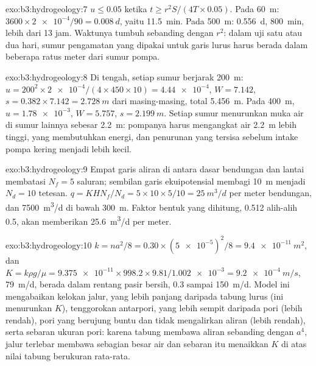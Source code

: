 \begin{solution}{exo:b3:hydrogeology:7}
$u \le 0.05$ ketika $t \ge r^2S/(4T\times0.05)$. Pada \qty{60}{m}: $3600\times
\num{2e-4}/90 = \qty{0.008}{d}$, yaitu \qty{11.5}{min}. Pada \qty{500}{m}:
\qty{0.556}{d}, \qty{800}{min}, lebih dari 13 jam. Waktunya tumbuh sebanding dengan $r^2$:
dalam uji satu atau dua hari, sumur pengamatan yang dipakai untuk garis lurus
harus berada dalam beberapa ratus meter dari sumur pompa.
\end{solution}

\begin{solution}{exo:b3:hydrogeology:8}
Di tengah, setiap sumur berjarak \qty{200}{m}: $u = 200^2\times\num{2e-4}/(4
\times450\times10) = \num{4.44e-4}$, $W = \num{7.142}$, $s = 0.382\times
7.142 = \qty{2.728}{m}$ dari masing-masing, total \qty{5.456}{m}. Pada
\qty{400}{m}, $u = \num{1.78e-3}$, $W = \num{5.757}$, $s =
\qty{2.199}{m}$. Setiap sumur menurunkan muka air di sumur lainnya sebesar
\qty{2.2}{m}: pompanya harus mengangkat air \qty{2.2}{m} lebih tinggi, yang
membutuhkan energi, dan penurunan yang tersisa sebelum intake pompa kering
menjadi lebih kecil.
\end{solution}

\begin{solution}{exo:b3:hydrogeology:9}
Empat garis aliran di antara dasar bendungan dan lantai membatasi $N_f = 5$
saluran; sembilan garis ekuipotensial membagi \qty{10}{m} menjadi $N_d = 10$
tetesan. $q = KHN_f/N_d = 5\times10\times5/10 = \qty{25}{m^3/d}$ per meter
bendungan, dan \qty{7500}{m^3/d} di bawah \qty{300}{m}. Faktor bentuk yang
dihitung, 0.512 alih-alih 0.5, akan memberikan \qty{25.6}{m^3/d} per meter.
\end{solution}

\begin{solution}{exo:b3:hydrogeology:10}
$k = na^2/8 = 0.30\times(\num{5e-5})^2/8 = \qty{9.4e-11}{m^2}$, dan $K =
k\rho g/\mu = \num{9.375e-11}\times998.2\times9.81/\num{1.002e-3} =
\qty{9.2e-4}{m/s}$, \qty{79}{m/d}, berada dalam rentang pasir bersih, 0.3 sampai
\qty{150}{m/d}. Model ini mengabaikan kelokan jalur, yang lebih panjang
daripada tabung lurus (ini menurunkan $K$), tenggorokan antarpori,
yang lebih sempit daripada pori (lebih rendah), pori yang berujung buntu dan tidak
mengalirkan aliran (lebih rendah), serta sebaran ukuran pori: karena tabung membawa
aliran sebanding dengan $a^4$, jalur terlebar membawa sebagian besar air dan
sebaran itu menaikkan $K$ di atas nilai tabung berukuran rata-rata.
\end{solution}

